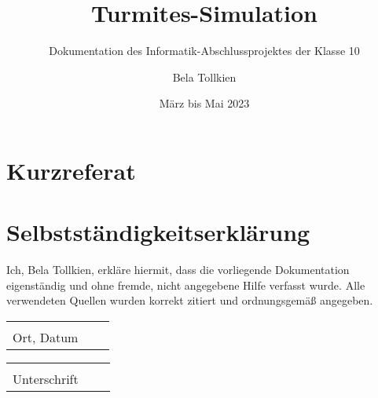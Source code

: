 \documentclass[
	fontsize=12pt,
	paper=a4,
	pagesize=auto,
	parskip=half,
    titlepage=true,
	ngerman
]{scrartcl}
\begin{document}
\title{
	Turmites-Simulation
}
\subtitle{
	Dokumentation des Informatik-Abschlussprojektes der Klasse 10
}
\author{
	Bela Tollkien
}
\date{März bis Mai 2023}

\maketitle

\tableofcontents

\section*{Kurzreferat}


\pagebreak



\pagebreak




\section*{Selbstständigkeitserklärung}
Ich, Bela Tollkien, erkläre hiermit, dass die vorliegende Dokumentation eigenständig und ohne fremde, nicht angegebene Hilfe verfasst wurde. Alle verwendeten Quellen wurden korrekt zitiert und ordnungsgemäß angegeben.

\vspace{2cm}

\noindent

\begin{tabular}{p{5cm}p{.5cm}l}
	\dotfill \\ 
	Ort, Datum
\end{tabular}
\hfill
\begin{tabular}{p{5cm}p{.5cm}l}
	\dotfill \\ 
	Unterschrift
\end{tabular}
\end{document}
